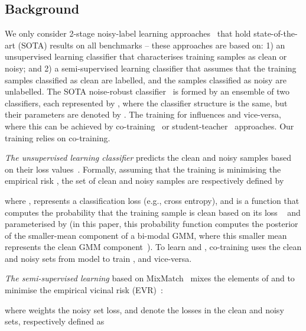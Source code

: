 \documentclass{article}
\begin{document}
\vspace{-.1in}
\subsection{Background}
\label{sec:background}

We only consider 2-stage noisy-label learning approaches~\cite{li2020dividemix, ding2018semi, kong2019recycling} that hold state-of-the-art (SOTA) results on all benchmarks -- these approaches are based on: 1) an unsupervised learning classifier that characterises training samples as clean or noisy; and 2) a semi-supervised learning classifier that assumes that the training samples classified as clean are labelled, and the samples classified as noisy are unlabelled.
The SOTA noise-robust classifier~\cite{li2020dividemix,nguyen2019self} is formed by an ensemble of two classifiers, each represented by , where the classifier structure is the same, but their parameters are denoted by .  The training for  influences  and vice-versa, where this can be achieved by co-training~\cite{li2020dividemix} or student-teacher~\cite{nguyen2019self} approaches. Our training relies on co-training.

\textit{The unsupervised learning classifier} predicts the clean and noisy samples based on their loss values~\cite{arazo2019unsupervised, li2020dividemix,rog, jiang2020beyond}. 
Formally, assuming that the training is minimising the empirical risk , the set of clean and noisy samples are respectively defined by 
\vspace{-.05in}

where ,
 represents a classification loss (e.g., cross entropy),
and 
 is a function that computes the probability that the training sample  is clean based on its loss ~\cite{jiang2020beyond, li2020dividemix, zhang2020distilling,nguyen2019self} and parameterised by  (in this paper, this probability function computes the posterior of the smaller-mean component of a bi-modal GMM, where this smaller mean represents the clean GMM component~\cite{li2020dividemix}). To learn  and , co-training uses the clean and noisy sets from model  to train , and vice-versa.
 
\textit{The semi-supervised learning} based on MixMatch~\cite{berthelot2019mixmatch} mixes the elements of  and  to minimise the empirical vicinal risk (EVR)~\cite{zhang2017mixup}:

where  weights the noisy set loss,  and  denote the losses in the clean and noisy sets, respectively defined as
\end{document}
